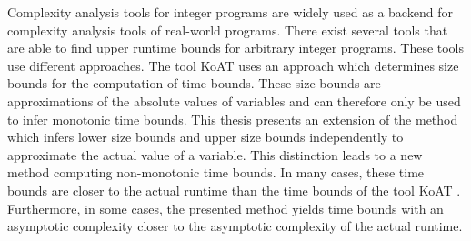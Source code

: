 Complexity analysis tools for integer programs are widely used as a backend for complexity analysis tools of real-world programs.
There exist several tools that are able to find upper runtime bounds for arbitrary integer programs.
These tools use different approaches.
The tool KoAT \cite{koat} uses an approach which determines size bounds for the computation of time bounds.
These size bounds are approximations of the absolute values of variables and can therefore only be used to infer monotonic time bounds.
This thesis presents an extension of the method which infers lower size bounds and upper size bounds independently to approximate the actual value of a variable.
This distinction leads to a new method computing non-monotonic time bounds.
In many cases, these time bounds are closer to the actual runtime than the time bounds of the tool KoAT \cite{koat}.
Furthermore, in some cases, the presented method yields time bounds with an asymptotic complexity closer to the asymptotic complexity of the actual runtime. 
